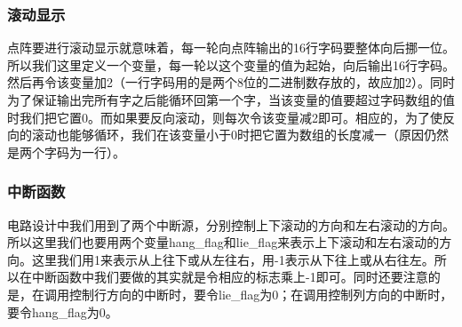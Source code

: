 \documentclass[UTF8]{ctexart}
\begin{document}
\subsubsection{滚动显示}
点阵要进行滚动显示就意味着，每一轮向点阵输出的16行字码要整体向后挪一位。所以我们这里定义一个变量，每一轮以这个变量的值为起始，向后输出16行字码。然后再令该变量加2（一行字码用的是两个8位的二进制数存放的，故应加2）。同时为了保证输出完所有字之后能循环回第一个字，当该变量的值要超过字码数组的值时我们把它置0。而如果要反向滚动，则每次令该变量减2即可。相应的，为了使反向的滚动也能够循环，我们在该变量小于0时把它置为数组的长度减一（原因仍然是两个字码为一行）。\par
\subsubsection{中断函数}
电路设计中我们用到了两个中断源，分别控制上下滚动的方向和左右滚动的方向。所以这里我们也要用两个变量hang_flag和lie_flag来表示上下滚动和左右滚动的方向。这里我们用1来表示从上往下或从左往右，用-1表示从下往上或从右往左。所以在中断函数中我们要做的其实就是令相应的标志乘上-1即可。同时还要注意的是，在调用控制行方向的中断时，要令lie_flag为0；在调用控制列方向的中断时，要令hang_flag为0。
\end{document}
